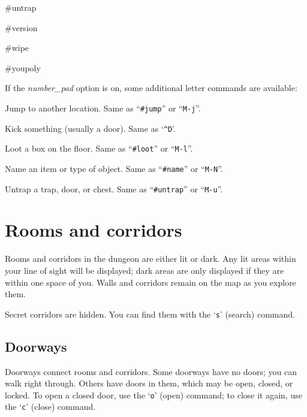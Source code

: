 \item[\tb{{\rm M}-{\rm u}}]
\#untrap

\item[\tb{{\rm M}-{\rm v}}]
\#version

\item[\tb{{\rm M}-{\rm w}}]
\#wipe

\item[\tb{{\rm M}-{\rm y}}]
\#youpoly
\elist
\nd %

If the
{\it number_pad\/} 
option is on, some additional letter commands are available:
\blist{}

\item[\ib{j}]
Jump to another location.  Same as ``{\tt \#jump}'' or ``{\tt M-j}''.

\item[\ib{k}]
Kick something (usually a door).  Same as `{\tt \^{}D}'.

\item[\ib{l}]
Loot a box on the floor.  Same as ``{\tt \#loot}'' or ``{\tt M-l}''.

\item[\ib{N}]
Name an item or type of object.  Same as ``{\tt \#name}'' or ``{\tt M-N}''.

\item[\ib{u}]
Untrap a trap, door, or chest.  Same as ``{\tt \#untrap}'' or ``{\tt M-u}''.

\elist
\nd %
\section{Rooms and corridors}


Rooms and corridors in the dungeon are either lit or dark.
Any lit areas within your line of sight will be displayed;  
dark areas are only displayed if they are within one space of you.
Walls and corridors remain on the map as you explore them.

Secret corridors are hidden.  You can find them with the `{\tt s}' (search)
command.
\subsection*{Doorways}


Doorways connect rooms and corridors.  Some doorways have no doors;
you can walk right through.  Others have doors in them, which may be
open, closed, or locked.  To open a closed door, use the `{\tt o}' (open)
command; to close it again, use the `{\tt c}' (close) command.

